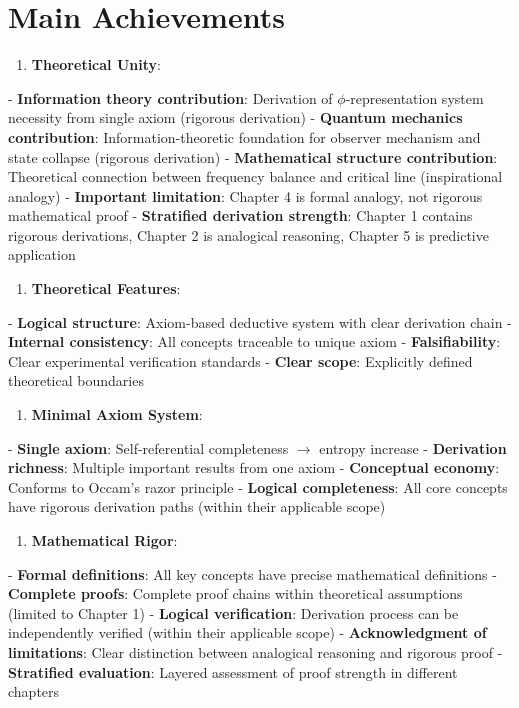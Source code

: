 \section{Main Achievements}
\label{sec:ch06_conclusion:main-achievements}

\begin{enumerate}
\item \textbf{Theoretical Unity}:
\end{enumerate}
   - \textbf{Information theory contribution}: Derivation of $\phi$-representation system necessity from single axiom (rigorous derivation)
   - \textbf{Quantum mechanics contribution}: Information-theoretic foundation for observer mechanism and state collapse (rigorous derivation)
   - \textbf{Mathematical structure contribution}: Theoretical connection between frequency balance and critical line (inspirational analogy)
   - \textbf{Important limitation}: Chapter 4 is formal analogy, not rigorous mathematical proof
   - \textbf{Stratified derivation strength}: Chapter 1 contains rigorous derivations, Chapter 2 is analogical reasoning, Chapter 5 is predictive application

\begin{enumerate}
\item \textbf{Theoretical Features}:
\end{enumerate}
   - \textbf{Logical structure}: Axiom-based deductive system with clear derivation chain
   - \textbf{Internal consistency}: All concepts traceable to unique axiom
   - \textbf{Falsifiability}: Clear experimental verification standards
   - \textbf{Clear scope}: Explicitly defined theoretical boundaries

\begin{enumerate}
\item \textbf{Minimal Axiom System}:
\end{enumerate}
   - \textbf{Single axiom}: Self-referential completeness $\rightarrow$ entropy increase
   - \textbf{Derivation richness}: Multiple important results from one axiom
   - \textbf{Conceptual economy}: Conforms to Occam's razor principle
   - \textbf{Logical completeness}: All core concepts have rigorous derivation paths (within their applicable scope)

\begin{enumerate}
\item \textbf{Mathematical Rigor}:
\end{enumerate}
   - \textbf{Formal definitions}: All key concepts have precise mathematical definitions
   - \textbf{Complete proofs}: Complete proof chains within theoretical assumptions (limited to Chapter 1)
   - \textbf{Logical verification}: Derivation process can be independently verified (within their applicable scope)
   - \textbf{Acknowledgment of limitations}: Clear distinction between analogical reasoning and rigorous proof
   - \textbf{Stratified evaluation}: Layered assessment of proof strength in different chapters

